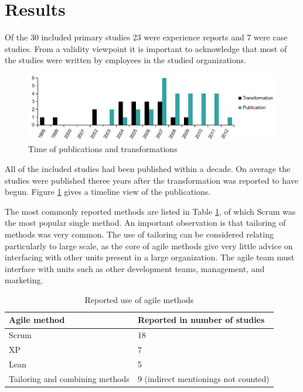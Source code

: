 \documentclass[lnbip]{svmultln}
\begin{document}
\section{Results}
\label{sec:results}

Of the 30 included primary studies 23 were experience reports and 7 were case
studies. From a validity viewpoint it is important to acknowledge that most of
the studies were written by employees in the studied organizations.

\begin{figure}[b]
  \begin{center}
    \includegraphics[width=1\textwidth]{publicationschart.pdf}
    \caption{Time of publications and transformations}
    \label{fig:publications}
  \end{center}
\end{figure}

All of the included studies had been published within a decade. On average the
studies were published theree years after the transformation was reported to
have begun. Figure \ref{fig:publications} gives a timeline view of the
publications.

The most commonly reported methods are listed in Table \ref{table:methods}, of
which Scrum was the most popular single method. An important observation is that
tailoring of methods was very common. The use of tailoring can be considered
relating particularly to large scale, as the core of agile methods give very
little advice on interfacing with other units present in a large organization.
The agile team must interface with units such as other development teams,
management, and marketing.

\begin{table}[t]
    \begin{tabular}{ l@{ \hskip 0.4cm } l }
        \toprule
        Agile method    & Reported in number of studies   \\ \midrule
        Scrum           & 18 \\ 
        XP              & 7 \\
        Lean            & 5 \\
        Tailoring and combining methods & 9  (indirect mentionings not counted) \\
        \bottomrule
    \end{tabular}
    \caption{Reported use of agile methods}
    \label{table:methods}
\end{table}
\end{document}
